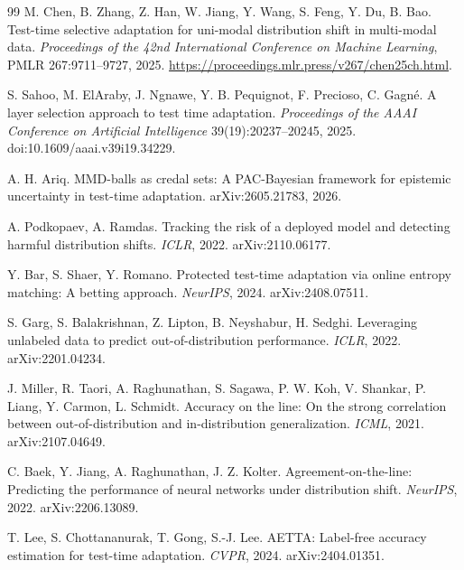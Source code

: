 \begin{thebibliography}{99}
 M. Chen, B. Zhang, Z. Han, W. Jiang, Y. Wang, S. Feng,
Y. Du, B. Bao. Test-time selective adaptation for uni-modal distribution shift in multi-modal data.
\emph{Proceedings of the 42nd International Conference on Machine Learning},
PMLR 267:9711--9727, 2025. \url{https://proceedings.mlr.press/v267/chen25ch.html}.

 S. Sahoo, M. ElAraby, J. Ngnawe, Y. B. Pequignot,
F. Precioso, C. Gagn\'e. A layer selection approach to test time adaptation.
\emph{Proceedings of the AAAI Conference on Artificial Intelligence}
39(19):20237--20245, 2025. doi:10.1609/aaai.v39i19.34229.

 A. H. Ariq. MMD-balls as credal sets: A PAC-Bayesian
framework for epistemic uncertainty in test-time adaptation. arXiv:2605.21783,
2026.

 A. Podkopaev, A. Ramdas. Tracking the risk of a
deployed model and detecting harmful distribution shifts. \emph{ICLR}, 2022.
arXiv:2110.06177.

 Y. Bar, S. Shaer, Y. Romano. Protected test-time adaptation via
online entropy matching: A betting approach. \emph{NeurIPS}, 2024. arXiv:2408.07511.

 S. Garg, S. Balakrishnan, Z. Lipton, B. Neyshabur, H. Sedghi.
Leveraging unlabeled data to predict out-of-distribution performance. \emph{ICLR},
2022. arXiv:2201.04234.

 J. Miller, R. Taori, A. Raghunathan, S. Sagawa, P. W. Koh,
V. Shankar, P. Liang, Y. Carmon, L. Schmidt. Accuracy on the line: On the strong
correlation between out-of-distribution and in-distribution generalization.
\emph{ICML}, 2021. arXiv:2107.04649.

 C. Baek, Y. Jiang, A. Raghunathan, J. Z. Kolter.
Agreement-on-the-line: Predicting the performance of neural networks under distribution shift.
\emph{NeurIPS}, 2022. arXiv:2206.13089.

 T. Lee, S. Chottananurak, T. Gong, S.-J. Lee. AETTA:
Label-free accuracy estimation for test-time adaptation. \emph{CVPR}, 2024.
arXiv:2404.01351.


\end{thebibliography}
